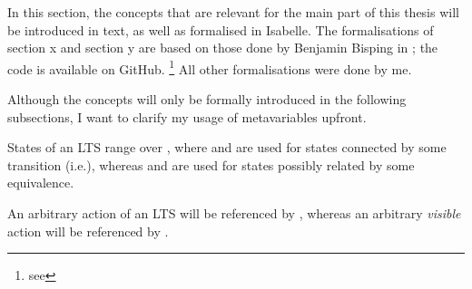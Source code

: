 %
\begin{isabellebody}%
%
%
\isadelimtheory
%
\endisadelimtheory
%
\isatagtheory
%
\endisatagtheory
{\isafoldtheory}%
%
\isadelimtheory
%
\endisadelimtheory
%
\isadelimdocument
%
\endisadelimdocument
%
\isatagdocument
%
\isamarkuptrue%
%
\endisatagdocument
{\isafolddocument}%
%
\isadelimdocument
%
\endisadelimdocument
%
\begin{isamarkuptext}%
\label{chap:preliminaries}%
\end{isamarkuptext}\isamarkuptrue%
%
\begin{isamarkuptext}%
In this section, the concepts that are relevant for the main part of this thesis will be introduced in text, as well as formalised in Isabelle. The formalisations of section x and section y are based on those done by Benjamin Bisping in \cite{bisping2018computing}; the code is available on GitHub.%
\footnote{see }
All other formalisations were done by me.%
\end{isamarkuptext}\isamarkuptrue%
%
\isadelimdocument
%
\endisadelimdocument
%
\isatagdocument
%
\isamarkuptrue%
%
\endisatagdocument
{\isafolddocument}%
%
\isadelimdocument
%
\endisadelimdocument
%
\begin{isamarkuptext}%
Although the concepts will only be formally introduced in the following subsections, I want to clarify my usage of metavariables upfront.

States of an LTS range over , where  and  are used for states connected by some transition (i.e.\@ {}), whereas  and  are used for states possibly related by some equivalence.

An arbitrary action of an LTS will be referenced by \isa{{\isasymalpha}}, whereas an arbitrary \emph{visible} action will be referenced by .%
\end{isamarkuptext}\isamarkuptrue%
%
\isadelimtheory
%
\endisadelimtheory
%
\isatagtheory
%
\endisatagtheory
{\isafoldtheory}%
%
\isadelimtheory
%
\endisadelimtheory
%
\end{isabellebody}%
\endinput

